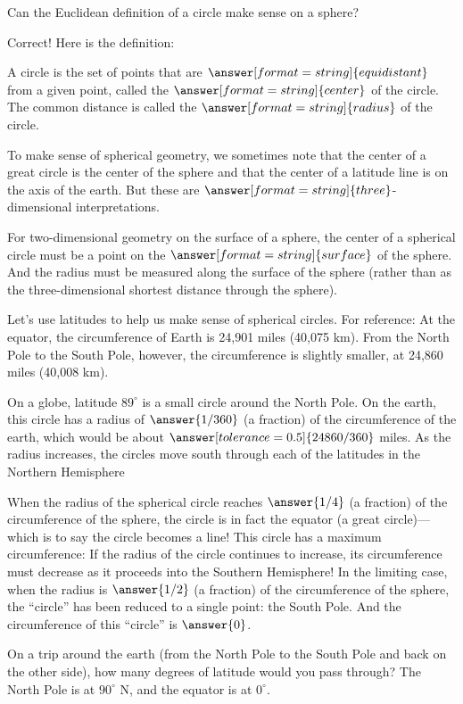 \documentclass{ximera}
\begin{document}
\begin{problem}
Can the Euclidean definition of a circle make sense on a sphere?  
\begin{multipleChoice}
\end{multipleChoice}
\begin{problem}
Correct! Here is the definition:  

A circle is the set of points that are $\answer[format=string]{equidistant}$ from a given point, called the $\answer[format=string]{center}$ of the circle.  The common distance is called the $\answer[format=string]{radius}$ of the circle.  
\begin{problem}
To make sense of spherical geometry, we sometimes note that the center of a great circle is the center of the sphere and that the center of a latitude line is on the axis of the earth.  But these are $\answer[format=string]{three}$-dimensional interpretations. 

For two-dimensional geometry on the surface of a sphere, the center of a spherical circle must be a point on the $\answer[format=string]{surface}$ of the sphere.  And the radius must be measured along the surface of the sphere (rather than as the three-dimensional shortest distance through the sphere). 

Let's use latitudes to help us make sense of spherical circles.  For reference:  At the equator, the circumference of Earth is 24,901 miles (40,075 km). From the North Pole to the South Pole, however, the circumference is slightly smaller, at 24,860 miles (40,008 km).  

On a globe, latitude $89^\circ$ is a small circle around the North Pole.  On the earth, this circle has a radius of $\answer{1/360}$ (a fraction) of the circumference of the earth, which would be about $\answer[tolerance=0.5]{24860/360}$ miles.  As the radius increases, the circles move south through each of the latitudes in the Northern Hemisphere

When the radius of the spherical circle reaches $\answer{1/4}$ (a fraction) of the circumference of the sphere, the circle is in fact the equator (a great circle)---which is to say the circle becomes a line!   This circle has a maximum circumference:  If the radius of the circle continues to increase, its circumference must decrease as it proceeds into the Southern Hemisphere!  In the limiting case, when the radius is $\answer{1/2}$ (a fraction) of the circumference of the sphere, the ``circle'' has been reduced to a single point:  the South Pole.  And the circumference of this ``circle'' is $\answer{0}$. 

\begin{hint}
On a trip around the earth (from the North Pole to the South Pole and back on the other side), how many degrees of latitude would you pass through?  The North Pole is at $90^\circ$ N, and the equator is at $0^\circ$.  
\end{hint}
\end{problem}
\end{problem}
\end{problem}
\end{document}
